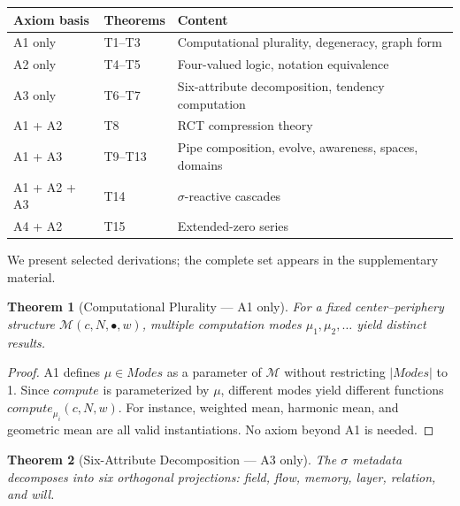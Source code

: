 \documentclass[11pt,a4paper]{article}
\newtheorem{theorem}{Theorem}[section]
\newcommand{\MDim}{\mathcal{M}}
\begin{document}
\begin{center}
\begin{tabular}{@{}lll@{}}
\toprule
Axiom basis & Theorems & Content \\
\midrule
A1 only & T1--T3 & Computational plurality, degeneracy, graph form \\
A2 only & T4--T5 & Four-valued logic, notation equivalence \\
A3 only & T6--T7 & Six-attribute decomposition, tendency computation \\
A1 + A2 & T8 & RCT compression theory \\
A1 + A3 & T9--T13 & Pipe composition, evolve, awareness, spaces, domains \\
A1 + A2 + A3 & T14 & $\sigma$-reactive cascades \\
A4 + A2 & T15 & Extended-zero series \\
\bottomrule
\end{tabular}
\end{center}

We present selected derivations; the complete set appears in the supplementary material.

\begin{theorem}[Computational Plurality --- A1 only]
\label{thm:plurality}
For a fixed center--periphery structure $\MDim(c, N, \bullet, w)$, multiple computation modes $\mu_1, \mu_2, \ldots$ yield distinct results.
\end{theorem}

\begin{proof}
A1 defines $\mu \in \textit{Modes}$ as a parameter of $\MDim$ without restricting $|\textit{Modes}|$ to 1. Since $\textit{compute}$ is parameterized by $\mu$, different modes yield different functions $\textit{compute}_{\mu_i}(c, N, w)$. For instance, weighted mean, harmonic mean, and geometric mean are all valid instantiations. No axiom beyond A1 is needed.
\end{proof}

\begin{theorem}[Six-Attribute Decomposition --- A3 only]
\label{thm:sixattr}
The $\sigma$ metadata decomposes into six orthogonal projections: field, flow, memory, layer, relation, and will.
\end{theorem}
\end{document}

